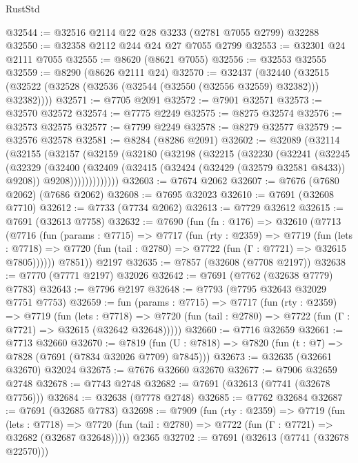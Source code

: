 \begin{lexlean}{RustStd}
\begin{coremodule}
@32544 := @32516 @2114 @22 @28 @3233 (@2781 @7055 @2799) @32288
@32550 := @32358 @2112 @244 @24 @27 @7055 @2799
@32553 := @32301 @24 @2111 @7055
@32555 := @8620 (@8621 @7055)
@32556 := @32553 @32555
@32559 := @8290 (@8626 @2111 @24)
@32570 := @32437
    (@32440 (@32515 (@32522 (@32528 (@32536 (@32544 (@32550 (@32556 @32559) @32382))) @32382))))
@32571 := @7705 @2091
@32572 := @7901 @32571
@32573 := @32570 @32572
@32574 := @7775 @2249
@32575 := @8275 @32574
@32576 := @32573 @32575
@32577 := @7799 @2249
@32578 := @8279 @32577
@32579 := @32576 @32578
@32581 := @8284 (@8286 @2091)
@32602 := @32089
    (@32114
      (@32155
        (@32157
          (@32159
            (@32180
              (@32198
                (@32215
                  (@32230
                    (@32241
                      (@32245
                        (@32329
                          (@32400
                            (@32409
                              (@32415 (@32424 (@32429 (@32579 @32581 @8433)) @9208))
                              @9208)))))))))))))
@32603 := @7674 @2062
@32607 := @7676 (@7680 @2062) (@7686 @2062)
@32608 := @7695 @32023
@32610 := @7691 (@32608 @7710)
@32612 := @7733 (@7734 @2062)
@32613 := @7729 @32612
@32615 := @7691 (@32613 @7758)
@32632 := @7690
    (fun (fn : @176) =>
    @32610
      (@7713
        (@7716
          (fun (params : @7715) =>
          @7717
            (fun (rty : @2359) =>
            @7719
              (fun (lets : @7718) =>
              @7720 (fun (tail : @2780) => @7722 (fun (Γ : @7721) => @32615 @7805))))))
        @7851))
    @2197
@32635 := @7857 (@32608 (@7708 @2197))
@32638 := @7770 (@7771 @2197) @32026
@32642 := @7691 (@7762 (@32638 @7779) @7783)
@32643 := @7796 @2197
@32648 := @7793 (@7795 @32643 @32029 @7751 @7753)
@32659 := fun (params : @7715) =>
  @7717
    (fun (rty : @2359) =>
    @7719
      (fun (lets : @7718) =>
      @7720 (fun (tail : @2780) => @7722 (fun (Γ : @7721) => @32615 (@32642 @32648)))))
@32660 := @7716 @32659
@32661 := @7713 @32660
@32670 := @7819
    (fun (U : @7818) => @7820 (fun (t : @7) => @7828 (@7691 (@7834 @32026 @7709) @7845)))
@32673 := @32635 (@32661 @32670) @32024
@32675 := @7676 @32660 @32670
@32677 := @7906 @32659 @2748
@32678 := @7743 @2748
@32682 := @7691 (@32613 (@7741 (@32678 @7756)))
@32684 := @32638 (@7778 @2748)
@32685 := @7762 @32684
@32687 := @7691 (@32685 @7783)
@32698 := @7909
    (fun (rty : @2359) =>
    @7719
      (fun (lets : @7718) =>
      @7720 (fun (tail : @2780) => @7722 (fun (Γ : @7721) => @32682 (@32687 @32648)))))
    @2365
@32702 := @7691 (@32613 (@7741 (@32678 @22570)))

\end{coremodule}
\end{lexlean}
